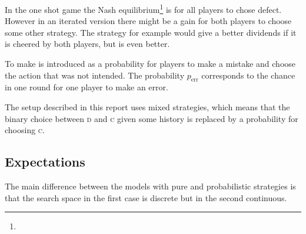 In the one shot game the Nash equilibrium\footnote{} is for all players to chose defect. However in an iterated version there might be a gain for both players to choose some other strategy. The strategy  for example would give a better dividends if it is cheered by both players, but  is even better. %
\mypar

To make \red{\dots}  is introduced as a probability for players to make a mistake and choose the action that was not intended. The probability $p_{\mathrm{err}}$ corresponds to the chance in one round for one player to make an error. %
\mypar

The setup described in this report uses mixed strategies, which means that the binary choice between \textsc{d} and \textsc{c} given some history is replaced by a probability for choosing \textsc{c}.

\subsection{Expectations}
The main difference between the models with pure and probabilistic strategies is that the search space in the first case is discrete but in the second continuous.

